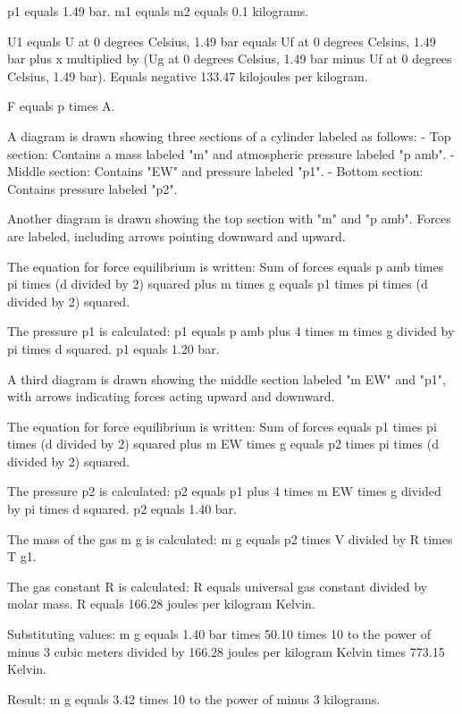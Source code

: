 p1 equals 1.49 bar.  
m1 equals m2 equals 0.1 kilograms.  

U1 equals U at 0 degrees Celsius, 1.49 bar equals Uf at 0 degrees Celsius, 1.49 bar plus x multiplied by (Ug at 0 degrees Celsius, 1.49 bar minus Uf at 0 degrees Celsius, 1.49 bar).  
Equals negative 133.47 kilojoules per kilogram.

F equals p times A.  

A diagram is drawn showing three sections of a cylinder labeled as follows:  
- Top section: Contains a mass labeled "m" and atmospheric pressure labeled "p amb".  
- Middle section: Contains "EW" and pressure labeled "p1".  
- Bottom section: Contains pressure labeled "p2".  

Another diagram is drawn showing the top section with "m" and "p amb". Forces are labeled, including arrows pointing downward and upward.  

The equation for force equilibrium is written:  
Sum of forces equals p amb times pi times (d divided by 2) squared plus m times g equals p1 times pi times (d divided by 2) squared.  

The pressure p1 is calculated:  
p1 equals p amb plus 4 times m times g divided by pi times d squared.  
p1 equals 1.20 bar.  

A third diagram is drawn showing the middle section labeled "m EW" and "p1", with arrows indicating forces acting upward and downward.  

The equation for force equilibrium is written:  
Sum of forces equals p1 times pi times (d divided by 2) squared plus m EW times g equals p2 times pi times (d divided by 2) squared.  

The pressure p2 is calculated:  
p2 equals p1 plus 4 times m EW times g divided by pi times d squared.  
p2 equals 1.40 bar.  

The mass of the gas m g is calculated:  
m g equals p2 times V divided by R times T g1.  

The gas constant R is calculated:  
R equals universal gas constant divided by molar mass.  
R equals 166.28 joules per kilogram Kelvin.  

Substituting values:  
m g equals 1.40 bar times 50.10 times 10 to the power of minus 3 cubic meters divided by 166.28 joules per kilogram Kelvin times 773.15 Kelvin.  

Result:  
m g equals 3.42 times 10 to the power of minus 3 kilograms.